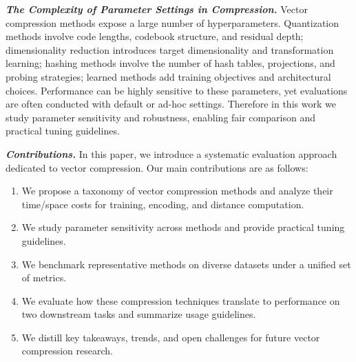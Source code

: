 \documentclass[sigconf]{acmart}
\begin{document}
\textbf{\emph{The Complexity of Parameter Settings in Compression.}}
Vector compression methods expose a large number of hyperparameters. 
Quantization methods involve code lengths, codebook structure, and residual depth; 
dimensionality reduction introduces target dimensionality and transformation learning; 
hashing methods involve the number of hash tables, projections, and probing
strategies; 
learned methods add training objectives and architectural choices. 
Performance can be highly sensitive to these parameters, yet evaluations are often conducted with default or ad-hoc settings. 
Therefore in this work we study parameter sensitivity and robustness, enabling fair comparison and practical tuning guidelines.

\textbf{\emph{Contributions.}}
In this paper, we introduce a systematic evaluation approach dedicated to vector compression. 
Our main contributions are as follows:
\begin{enumerate}
    \item We propose a taxonomy of vector compression methods and analyze their time/space costs for training, encoding, and distance computation.
    
    \item We study parameter sensitivity across methods and provide practical tuning guidelines.
    
    \item We benchmark representative methods on diverse datasets under a unified set of metrics.
    
    \item We evaluate how these compression techniques translate to performance on two downstream tasks and summarize usage guidelines.
    
    \item We distill key takeaways, trends, and open challenges for future vector compression research.
\end{enumerate}






\end{document}
